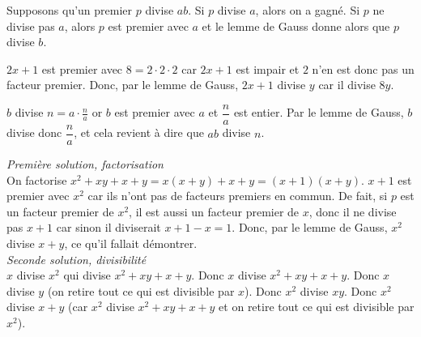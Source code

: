 \begin{sol}
Supposons qu'un premier $p$ divise $ab$. Si $p$ divise $a$, alors on a gagné. Si $p$ ne divise pas $a$, alors $p$ est premier avec $a$ et le lemme de Gauss donne alors que $p$ divise $b$.
\end{sol}


\begin{sol}
$2x+1$ est premier avec $8 = 2 \cdot 2 \cdot 2$ car $2x+1$ est impair et $2$ n'en est donc pas un facteur premier. Donc, par le lemme de Gauss, $2x+1$ divise $y$ car il divise $8y$.
\end{sol}


\begin{sol}
$b$ divise $n = a \cdot \frac n a$ or $b$ est premier avec $a$ et $\dfrac n a$ est entier. Par le lemme de Gauss, $b$ divise donc $\dfrac n a$, et cela revient à dire que $ab$ divise $n$.
\end{sol}


\begin{sol}
\textit{Première solution, factorisation} \\
On factorise $x^2 + xy + x + y = x\left(x+y\right) + x+y = (x + 1)(x + y)$. $x+1$ est premier avec $x^2$ car ils n'ont pas de facteurs premiers en commun. De fait, si $p$ est un facteur premier de $x^2$, il est aussi un facteur premier de $x$, donc il ne divise pas $x+1$ car sinon il diviserait $x+1-x=1$. Donc, par le lemme de Gauss, $x^2$ divise $x+y$, ce qu'il fallait démontrer. \\
\textit{Seconde solution, divisibilité} \\
$x$ divise $x^2$ qui divise $x^2 + xy + x + y$. Donc $x$ divise $x^2 + xy + x + y$. Donc $x$ divise $y$ (on retire tout ce qui est divisible par $x$). Donc $x^2$ divise $xy$. Donc $x^2$ divise $x + y$ (car $x^2$ divise $x^2 + xy + x + y$ et on retire tout ce qui est divisible par $x^2$).
\end{sol}